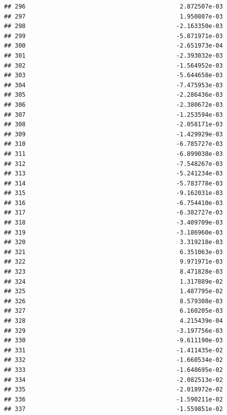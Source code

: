 \documentclass[
]{article}
\begin{document}
\begin{verbatim}
## 296                                           2.872507e-03
## 297                                           1.950807e-03
## 298                                          -2.163350e-03
## 299                                          -5.871971e-03
## 300                                          -2.651973e-04
## 301                                          -2.393032e-03
## 302                                          -1.564952e-03
## 303                                          -5.644658e-03
## 304                                          -7.475953e-03
## 305                                          -2.286436e-03
## 306                                          -2.380672e-03
## 307                                          -1.253594e-03
## 308                                          -2.058171e-03
## 309                                          -1.429929e-03
## 310                                          -6.785727e-03
## 311                                          -6.899038e-03
## 312                                          -7.548267e-03
## 313                                          -5.241234e-03
## 314                                          -5.783778e-03
## 315                                          -9.162031e-03
## 316                                          -6.754410e-03
## 317                                          -6.382727e-03
## 318                                          -3.409709e-03
## 319                                          -3.186960e-03
## 320                                           3.319218e-03
## 321                                           6.351063e-03
## 322                                           9.971971e-03
## 323                                           8.471828e-03
## 324                                           1.317889e-02
## 325                                           1.487795e-02
## 326                                           8.579308e-03
## 327                                           6.160205e-03
## 328                                           4.215439e-04
## 329                                          -3.197756e-03
## 330                                          -9.611190e-03
## 331                                          -1.411435e-02
## 332                                          -1.660534e-02
## 333                                          -1.648695e-02
## 334                                          -2.082513e-02
## 335                                          -2.018972e-02
## 336                                          -1.590211e-02
## 337                                          -1.559851e-02

\end{verbatim}
\end{document}
